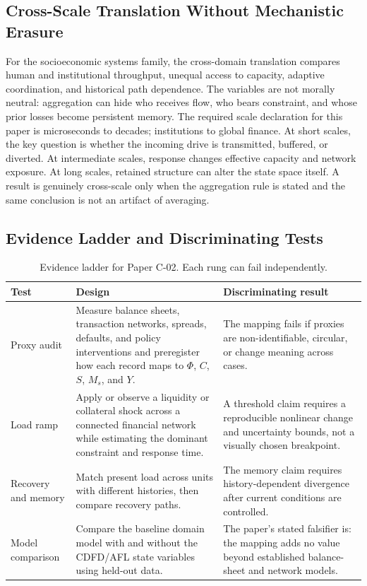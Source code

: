 \documentclass[11pt,a4paper]{article}
\begin{document}
\subsection{Cross-Scale Translation Without Mechanistic Erasure}

For the socioeconomic systems family, the cross-domain translation compares human and institutional throughput, unequal access to capacity, adaptive coordination, and historical path dependence. The variables are not morally neutral: aggregation can hide who receives flow, who bears constraint, and whose prior losses become persistent memory. \cite{BarabasiAlbert1999,WattsStrogatz1998,Holling1973,Shannon1948}
The required scale declaration for this paper is microseconds to decades; institutions to global finance. At short
scales, the key question is whether the incoming drive is transmitted,
buffered, or diverted. At intermediate scales, response changes effective
capacity and network exposure. At long scales, retained structure can alter the
state space itself. A result is genuinely cross-scale only when the aggregation
rule is stated and the same conclusion is not an artifact of averaging.

\subsection{Evidence Ladder and Discriminating Tests}

\begin{table}[htbp]
\centering
\small
\caption{Evidence ladder for Paper C-02. Each rung can fail independently.}
\begin{tabularx}{\textwidth}{|p{}|X|X|}
\hline
\textbf{Test} & \textbf{Design} & \textbf{Discriminating result} \\
\hline
Proxy audit & Measure balance sheets, transaction networks, spreads, defaults, and policy interventions and preregister how each record maps to $\Phi$, $C$, $S$, $M_s$, and $Y$. & The mapping fails if proxies are non-identifiable, circular, or change meaning across cases. \\
\hline
Load ramp & Apply or observe a liquidity or collateral shock across a connected financial network while estimating the dominant constraint and response time. & A threshold claim requires a reproducible nonlinear change and uncertainty bounds, not a visually chosen breakpoint. \\
\hline
Recovery and memory & Match present load across units with different histories, then compare recovery paths. & The memory claim requires history-dependent divergence after current conditions are controlled. \\
\hline
Model comparison & Compare the baseline domain model with and without the CDFD/AFL state variables using held-out data. & The paper's stated falsifier is: the mapping adds no value beyond established balance-sheet and network models. \\
\hline
\end{tabularx}
\end{table}
\end{document}
